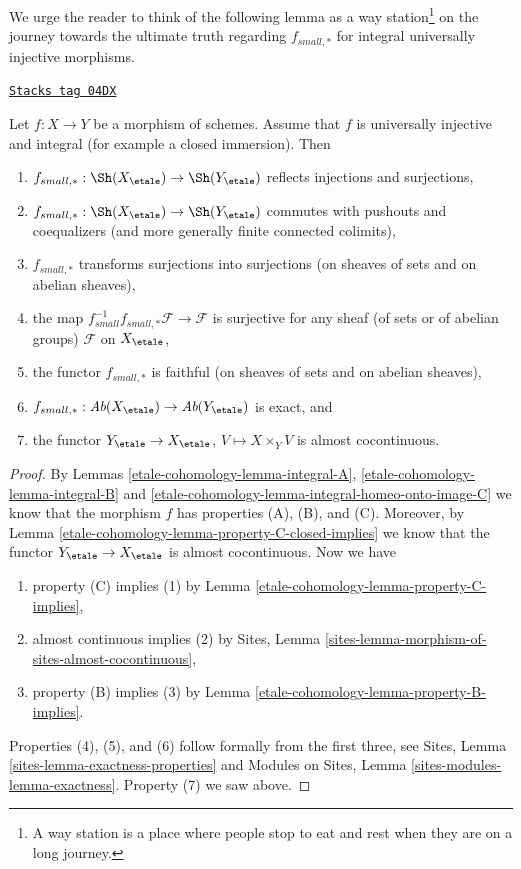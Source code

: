 We urge the reader to think of the following lemma as a
way station\footnote{A way station is a place where people stop to eat
and rest when they are on a long journey.} on the journey towards the
ultimate truth regarding $f_{small, *}$ for integral universally injective
morphisms.

\begin{lemma}
\label{etale-cohomology-lemma-integral-universally-injective}
\href{https://stacks.math.columbia.edu/tag/04DX}{\texttt{Stacks tag 04DX}}

Let $f : X \to Y$ be a morphism of schemes. Assume that $f$ is
universally injective and integral (for example a closed immersion).
Then
\begin{enumerate}
\item
$f_{small, *} :
\Sh(X_\etale)
\to
\Sh(Y_\etale)$
reflects injections and surjections,
\item
$f_{small, *} :
\Sh(X_\etale)
\to
\Sh(Y_\etale)$
commutes with pushouts and coequalizers (and more generally
finite connected colimits),
\item $f_{small, *}$ transforms surjections into surjections (on sheaves
of sets and on abelian sheaves),
\item the map
$f_{small}^{-1}f_{small, *}\mathcal{F} \to \mathcal{F}$
is surjective for any sheaf (of sets or of abelian groups)
$\mathcal{F}$ on $X_\etale$,
\item the functor $f_{small, *}$ is faithful (on sheaves of sets and
on abelian sheaves),
\item
$f_{small, *} :
\textit{Ab}(X_\etale)
\to
\textit{Ab}(Y_\etale)$
is exact, and
\item the functor
$Y_\etale \to X_\etale$, $V \mapsto X \times_Y V$ is
almost cocontinuous.
\end{enumerate}
\end{lemma}

\begin{proof}
By
Lemmas \ref{etale-cohomology-lemma-integral-A},
\ref{etale-cohomology-lemma-integral-B} and
\ref{etale-cohomology-lemma-integral-homeo-onto-image-C}
we know that the morphism $f$ has properties (A), (B), and (C).
Moreover, by
Lemma \ref{etale-cohomology-lemma-property-C-closed-implies}
we know that the functor $Y_\etale \to X_\etale$ is
almost cocontinuous. Now we have
\begin{enumerate}
\item property (C) implies (1) by
Lemma \ref{etale-cohomology-lemma-property-C-implies},
\item almost continuous implies (2) by
Sites, Lemma \ref{sites-lemma-morphism-of-sites-almost-cocontinuous},
\item property (B) implies (3) by
Lemma \ref{etale-cohomology-lemma-property-B-implies}.
\end{enumerate}
Properties (4), (5), and (6) follow formally from the first three, see
Sites, Lemma \ref{sites-lemma-exactness-properties}
and
Modules on Sites, Lemma \ref{sites-modules-lemma-exactness}.
Property (7) we saw above.
\end{proof}

